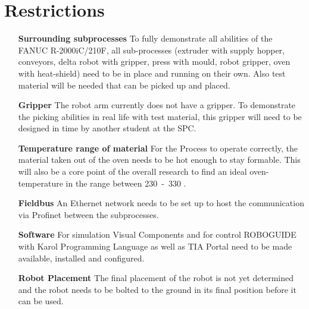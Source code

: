 
\chapter{Restrictions}

\begin{itemize}[leftmargin=5cm]
	\item[\textbf{Surrounding subprocesses}] To fully demonstrate all abilities of the  FANUC R-2000iC/210F, all sub-processes (extruder with supply hopper, conveyors, delta robot with gripper, press with mould, robot gripper, oven with heat-shield) need to be in place and running on their own. Also test material will be needed that can be picked up and placed.
	\item[\textbf{Gripper}] The robot arm currently does not have a gripper. To demonstrate the picking abilities in real life with test material, this gripper will need to be designed in time by another student at the SPC.
	\item[\textbf{Temperature range of material}] For the Process to operate correctly, the material taken out of the oven needs to be hot enough to stay formable. This will also be a core point of the overall research to find an ideal oven-temperature in the range between \si{230-330}{\celsius} .
	\item[\textbf{Fieldbus}] An Ethernet network needs to be set up to host the communication via Profinet between the subprocesses.
	\item[\textbf{Software}] For simulation Visual Components and for control ROBOGUIDE with Karol Programming Language as well as TIA Portal need to be made available, installed and configured. 
	\item[\textbf{Robot Placement}] The final placement of the robot is not yet determined and the robot needs to be bolted to the ground in its final position before it can be used.
\end{itemize}